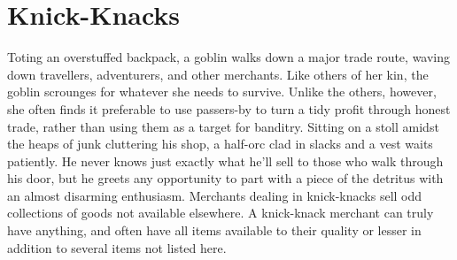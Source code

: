 \documentclass[10pt,a4paper,twoside,twocolumn,openany,nodeprecatedcode,bg=print]{dndbook}
\begin{document}
\section{Knick-Knacks}
Toting an overstuffed backpack, a goblin walks down a major trade route, waving down travellers, adventurers, and other merchants. Like others of her kin, the goblin scrounges for whatever she needs to survive. Unlike the others, however, she often finds it preferable to use passers-by to turn a tidy profit through honest trade, rather than using them as a target for banditry.
Sitting on a stoll amidst the heaps of junk cluttering his shop, a half-orc clad in slacks and a vest waits patiently. He never knows just exactly what he'll sell to those who walk through his door, but he greets any opportunity to part with a piece of the detritus with an almost disarming enthusiasm.
Merchants dealing in knick-knacks sell odd collections of goods not available elsewhere. A knick-knack merchant can truly have anything, and often have all items available to their quality or lesser in addition to several items not listed here.
\end{document}
